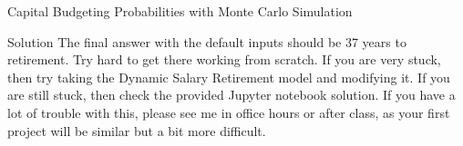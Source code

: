 \documentclass[]{article}
\begin{document}
\begin{section}{Capital Budgeting Probabilities with Monte Carlo Simulation}
\begin{subsection}{Solution}
                        The final answer with the default inputs should be 37 years to retirement. Try hard to get
                        there working from scratch. If you are very stuck, then try taking the Dynamic Salary
                        Retirement model and modifying it. If you are still stuck, then check the provided Jupyter 
                        notebook solution. If you have a lot of trouble with this, please see me in office hours or
                        after class, as your first project will be similar but a bit more difficult.
                        
\end{subsection}
\end{section}
\end{document}
